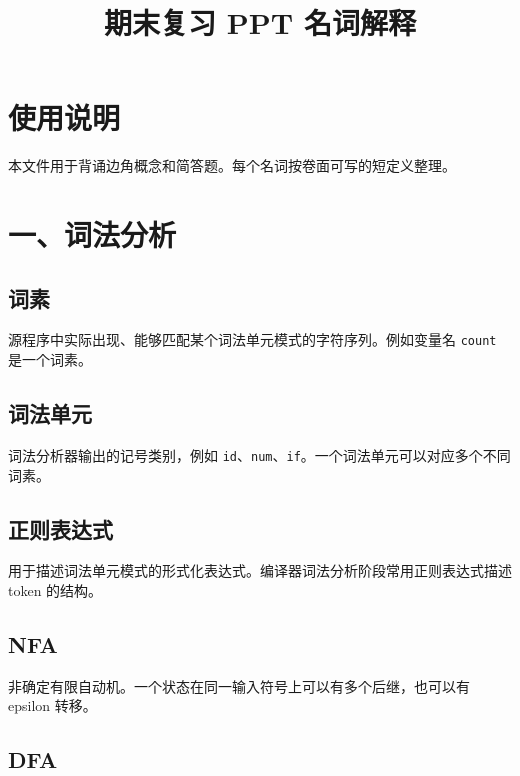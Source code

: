 \documentclass[UTF8,zihao=-4]{ctexart}
\title{期末复习 PPT 名词解释}
\author{}
\date{}
\begin{document}
\maketitle
\setcounter{tocdepth}{1}
\tableofcontents
\newpage


\section*{使用说明}

本文件用于背诵边角概念和简答题。每个名词按卷面可写的短定义整理。

\section*{一、词法分析}

\subsection*{词素}

源程序中实际出现、能够匹配某个词法单元模式的字符序列。例如变量名 \texttt{count} 是一个词素。

\subsection*{词法单元}

词法分析器输出的记号类别，例如 \texttt{id}、\texttt{num}、\texttt{if}。一个词法单元可以对应多个不同词素。

\subsection*{正则表达式}

用于描述词法单元模式的形式化表达式。编译器词法分析阶段常用正则表达式描述 token 的结构。

\subsection*{NFA}

非确定有限自动机。一个状态在同一输入符号上可以有多个后继，也可以有 epsilon 转移。

\subsection*{DFA}
\end{document}
